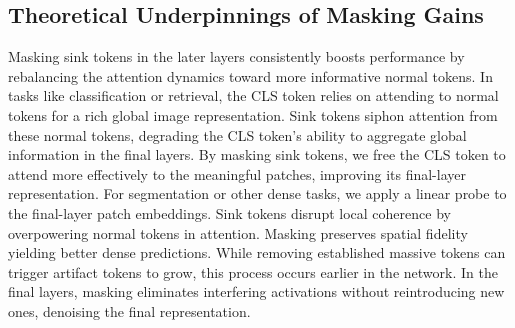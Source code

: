 \documentclass[10pt,twocolumn,letterpaper]{article}
\begin{document}
\subsection{Theoretical Underpinnings of Masking Gains}
Masking sink tokens in the later layers consistently boosts performance by rebalancing the attention dynamics toward more informative normal tokens. In tasks like classification or retrieval, the CLS token relies on attending to normal tokens for a rich global image representation. Sink tokens siphon attention from these normal tokens, degrading the CLS token’s ability to aggregate global information in the final layers. By masking sink tokens, we free the CLS token to attend more effectively to the meaningful patches, improving its final-layer representation. For segmentation or other dense tasks, we apply a linear probe to the final-layer patch embeddings. Sink tokens disrupt local coherence by overpowering normal tokens in attention. Masking preserves spatial fidelity yielding better dense predictions. While removing established massive tokens can trigger artifact tokens to grow, this process occurs earlier in the network. In the final layers, masking eliminates interfering activations without reintroducing new ones, denoising the final representation.
\end{document}
